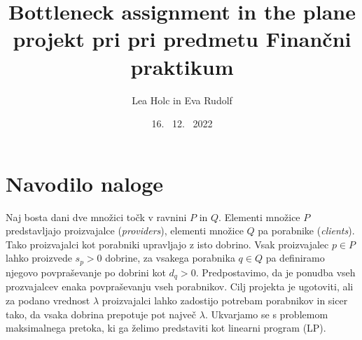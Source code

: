 \documentclass[a4paper, pt14]{article}
\begin{document}
\title{%
  Bottleneck assignment in the plane \\
  \large projekt pri pri predmetu Finančni praktikum}
\author{Lea Holc in Eva Rudolf}
\date{16. \ 12. \ 2022}

\maketitle

\section{Navodilo naloge}
Naj bosta dani dve množici točk v ravnini $P$ in $Q$. Elementi množice $P$ predstavljajo proizvajalce (\textsl{providers}), elementi množice $Q$ pa porabnike (\textsl{clients}). Tako proizvajalci kot porabniki upravljajo z isto dobrino. Vsak proizvajalec $p \in P$ lahko proizvede $s_p > 0$ dobrine, za vsakega porabnika $q \in Q$ pa definiramo njegovo povpraševanje po dobrini kot $d_q > 0$. Predpostavimo, da je ponudba vseh prozvajalcev enaka povpraševanju vseh porabnikov. Cilj projekta je ugotoviti, ali za podano vrednost $\lambda$ proizvajalci lahko zadostijo potrebam porabnikov in sicer tako, da vsaka dobrina prepotuje pot največ $\lambda$. Ukvarjamo se s problemom maksimalnega pretoka, ki ga želimo predstaviti kot linearni program (LP).
\end{document}

